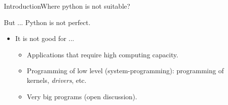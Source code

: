 \documentclass[10pt,compress]{beamer} %
\begin{document}
\begin{frame}[plain]{Introduction}{Where python is not suitable?}
	
	But ... Python is not perfect.
	\begin{itemize}
	\item It is not good for  ...
	\begin{itemize}
	\item Applications that require high computing capacity.
	\item Programming of low level (system-programming): programming of kernels, \textit{drivers}, etc.
	\item Very big programs (open discussion).
	\end{itemize}
	\end{itemize}
\end{frame}
\end{document}
